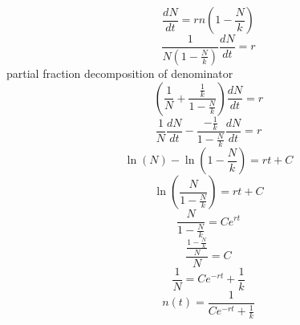 \documentclass{article}
\begin{document}
\[\frac{dN}{dt}=rn\left(1-\frac{N}{k}\right)\]
\[\frac{1}{N\left(1-\frac{N}{k}\right)}\frac{dN}{dt}=r\]
partial fraction decomposition of denominator
\[\left(\frac{1}{N}+\frac{\frac{1}{k}}{1-\frac{N}{k}}\right)\frac{dN}{dt}=r\]
\[\frac{1}{N}\frac{dN}{dt}-\frac{-\frac{1}{k}}{1-\frac{N}{k}}\frac{dN}{dt}=r\]
\[\ln(N)-\ln(1-\frac{N}{k})=rt+C\]
\[\ln\left(\frac{N}{1-\frac{N}{k}}\right)=rt+C\]
\[\frac{N}{1-\frac{N}{k}}=Ce^{rt}\]
\[\frac{\frac{1-\frac{N}{k}}N}{N}=C\]
\[\frac{1}{N}=Ce^{-rt}+\frac{1}{k}\]
\[n(t)=\frac{1}{Ce^{-rt}+\frac{1}{k}}\]
\end{document}
